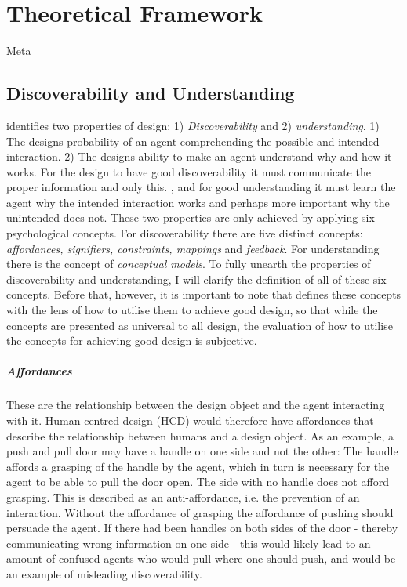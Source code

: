 \chapter{Theoretical Framework}

Meta

\section{Discoverability and Understanding}
 identifies two properties of design: 1) \textit{Discoverability} and 2) \textit{understanding}. 1) The designs probability of an agent comprehending the possible and intended interaction. 2) The designs ability to make an agent understand why and how it works. For the design to have good discoverability it must communicate the proper information and only this. , and for good understanding it must learn the agent why the intended interaction works and perhaps more important why the unintended does not. These two properties are only achieved by applying six psychological concepts. For discoverability there are five distinct concepts: \textit{affordances, signifiers, constraints, mappings} and \textit{feedback}. For understanding there is the concept of \textit{conceptual models}. To fully unearth the properties of discoverability and understanding, I will clarify the definition of all of these six concepts. Before that, however, it is important to note that  defines these concepts with the lens of how to utilise them to achieve good design, so that while the concepts are presented as universal to all design, the evaluation of how to utilise the concepts for achieving good design is subjective.
\paragraph{Affordances} These are the relationship between the design object and the agent interacting with it. Human-centred design (HCD) would therefore have affordances that describe the relationship between humans and a design object. As an example, a push and pull door may have a handle on one side and not the other: The handle affords a grasping of the handle by the agent, which in turn is necessary for the agent to be able to pull the door open. The side with no handle does not afford grasping. This is described as an anti-affordance, i.e. the prevention of an interaction. Without the affordance of grasping the affordance of pushing should persuade the agent. If there had been handles on both sides of the door - thereby communicating wrong information on one side - this would likely lead to an amount of confused agents who would pull where one should push, and would be an example of misleading discoverability. \cite{norman}
